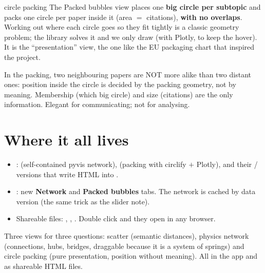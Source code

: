 \documentclass[11pt,a4paper]{article}
\begin{document}
\begin{concepto}{circle packing}
The Packed bubbles view places one \textbf{big circle per subtopic} and packs one circle per
paper inside it (area $=$ citations), \textbf{with no overlaps}. Working out where each circle
goes so they fit tightly is a classic geometry problem; the  library solves it
and we only draw (with Plotly, to keep the hover). It is the ``presentation'' view, the one
like the EU packaging chart that inspired the project.
\end{concepto}

\begin{ojo}
In the packing, two neighbouring papers are NOT more alike than two distant ones: position
inside the circle is decided by the packing geometry, not by meaning. Membership (which big
circle) and size (citations) are the only information. Elegant for communicating; not for
analysing.
\end{ojo}

\section{Where it all lives}

\begin{itemize}
  \item {}:  (self-contained pyvis network),
         (packing with circlify $+$ Plotly), and their
        / versions that write HTML into
        .
  \item {}: new \textbf{Network} and \textbf{Packed bubbles} tabs. The network is
        cached by data version (the same trick as the slider note).
  \item Shareable files: , ,
        . Double click and they open in any browser.
\end{itemize}

\begin{resumen}
Three views for three questions: scatter (semantic distances), physics network (connections,
hubs, bridges, draggable because it is a system of springs) and circle packing (pure
presentation, position without meaning). All in the app and as shareable HTML files.
\end{resumen}
\end{document}

